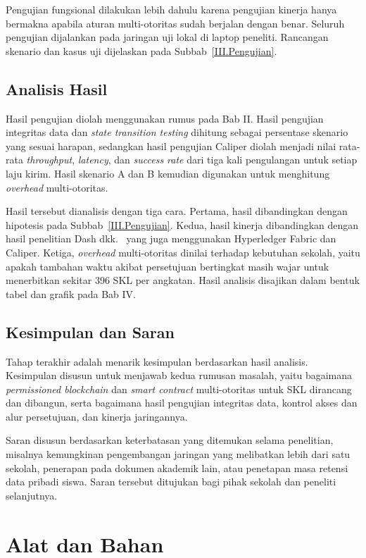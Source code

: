 Pengujian fungsional dilakukan lebih dahulu karena pengujian kinerja hanya bermakna apabila aturan multi-otoritas sudah berjalan dengan benar. Seluruh pengujian dijalankan pada jaringan uji lokal di laptop peneliti. Rancangan skenario dan kasus uji dijelaskan pada Subbab~\ref{III.Pengujian}.

\subsection{Analisis Hasil}
Hasil pengujian diolah menggunakan rumus pada Bab II. Hasil pengujian integritas data dan \textit{state transition testing} dihitung sebagai persentase skenario yang sesuai harapan, sedangkan hasil pengujian Caliper diolah menjadi nilai rata-rata \textit{throughput}, \textit{latency}, dan \textit{success rate} dari tiga kali pengulangan untuk setiap laju kirim. Hasil skenario A dan B kemudian digunakan untuk menghitung \textit{overhead} multi-otoritas.

Hasil tersebut dianalisis dengan tiga cara. Pertama, hasil dibandingkan dengan hipotesis pada Subbab~\ref{III.Pengujian}. Kedua, hasil kinerja dibandingkan dengan hasil penelitian Dash dkk.~\cite{Dash2025Hyperledger} yang juga menggunakan Hyperledger Fabric dan Caliper. Ketiga, \textit{overhead} multi-otoritas dinilai terhadap kebutuhan sekolah, yaitu apakah tambahan waktu akibat persetujuan bertingkat masih wajar untuk menerbitkan sekitar 396 SKL per angkatan. Hasil analisis disajikan dalam bentuk tabel dan grafik pada Bab IV.

\subsection{Kesimpulan dan Saran}
Tahap terakhir adalah menarik kesimpulan berdasarkan hasil analisis. Kesimpulan disusun untuk menjawab kedua rumusan masalah, yaitu bagaimana \textit{permissioned blockchain} dan \textit{smart contract} multi-otoritas untuk SKL dirancang dan dibangun, serta bagaimana hasil pengujian integritas data, kontrol akses dan alur persetujuan, dan kinerja jaringannya.

Saran disusun berdasarkan keterbatasan yang ditemukan selama penelitian, misalnya kemungkinan pengembangan jaringan yang melibatkan lebih dari satu sekolah, penerapan pada dokumen akademik lain, atau penetapan masa retensi data pribadi siswa. Saran tersebut ditujukan bagi pihak sekolah dan peneliti selanjutnya.

\section{Alat dan Bahan}
